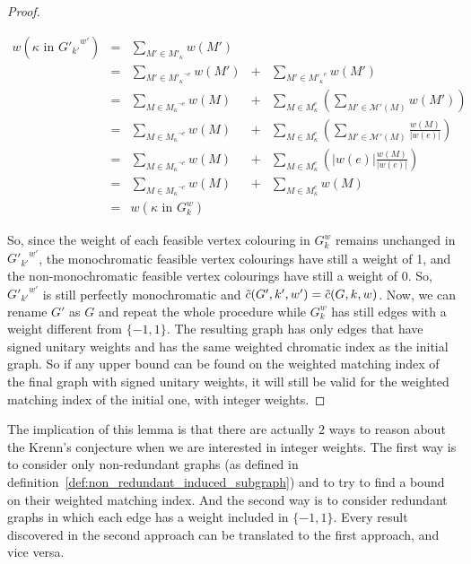 \begin{proof}
    \begin{center}
        $\begin{array}{lclcl}
            w(\kappa \mbox{ in } {G'_{k'}}^{w'})
                & = & \sum\limits_{M' \in M'_{\kappa}} w(M') \\
                & = & \sum\limits_{M' \in {M'_{\kappa}}^{\neg e}} w(M') & + & \sum\limits_{M' \in {M'_{\kappa}}^{e}} w(M') \\
                & = & \sum\limits_{M \in {M_{\kappa}}^{\neg e}} w(M)    & + & \sum\limits_{M \in M_{\kappa}^e} \left( \sum\limits_{M' \in \mathcal{M}'(M)} w(M') \right) \\
                & = & \sum\limits_{M \in {M_{\kappa}}^{\neg e}} w(M)    & + & \sum\limits_{M \in M_{\kappa}^e} \left( \sum\limits_{M' \in \mathcal{M}'(M)} \frac{w(M)}{|w(e)|} \right) \\
                & = & \sum\limits_{M \in {M_{\kappa}}^{\neg e}} w(M)    & + & \sum\limits_{M \in M_{\kappa}^e} \left( |w(e)| \frac{w(M)}{|w(e)|} \right) \\
                & = & \sum\limits_{M \in {M_{\kappa}}^{\neg e}} w(M)    & + & \sum\limits_{M \in M_{\kappa}^e} w(M) \\
                & = & w(\kappa \mbox{ in } G_k^w)
        \end{array}$
    \end{center}

    So, since the weight of each feasible vertex colouring in $G_k^w$ remains unchanged in ${G'_{k'}}^{w'}$, the monochromatic feasible vertex colourings have still a weight of 1, and the non-monochromatic feasible vertex colourings have still a weight of 0.
    So, ${G'_{k'}}^{w'}$ is still perfectly monochromatic and $\Tilde{c}(G', k', w') = \Tilde{c}(G, k, w)$.
    Now, we can rename $G'$ as $G$ and repeat the whole procedure while $G_k^w$ has still edges with a weight different from $\{-1, 1\}$.
    The resulting graph has only edges that have signed unitary weights and has the same weighted chromatic index as the initial graph.
    So if any upper bound can be found on the weighted matching index of the final graph with signed unitary weights, it will still be valid for the weighted matching index of the initial one, with integer weights.
\end{proof}

The implication of this lemma is that there are actually $2$ ways to reason about the Krenn's conjecture when we are interested in integer weights.
The first way is to consider only non-redundant graphs (as defined in definition~\ref{def:non_redundant_induced_subgraph}) and to try to find a bound on their weighted matching index.
And the second way is to consider redundant graphs in which each edge has a weight included in $\{-1, 1\}$.
Every result discovered in the second approach can be translated to the first approach, and vice versa.


